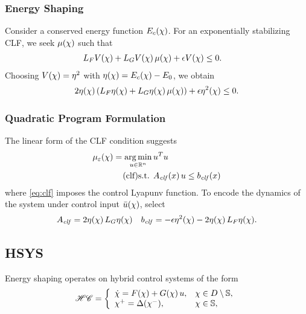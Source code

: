 \begin{frame}
  \frametitle{Energy Shaping}
  Consider a conserved energy function $E_{c}(\chi)$. For an exponentially stabilizing CLF, we seek $\mu(\chi)$ such that
  \begin{align*}
    L_{F} V(\chi) + L_{G} V(\chi) \, \mu(\chi) + \epsilon V(\chi) &\leq 0.
  \end{align*}
  Choosing $V(\chi) = \eta^{2}$ with $\eta(\chi) = E_{c}(\chi) - E_{0}$, we obtain
  \begin{align*}
    2 \eta(\chi) \left(L_{F} \eta(\chi) + L_{G} \eta(\chi) \, \mu(\chi) \right) + \epsilon \eta^{2}(\chi) \leq 0.
  \end{align*}
\end{frame}

\begin{frame}[t]
  \frametitle{Quadratic Program Formulation}
  The linear form of the CLF condition suggests
  \begin{align}
    \nonumber
    \mueps\arx = \argmin_{\uu \in \R^{n}}  \, & \uu^T \uu\\
    \label{eq:clf} \tag{clf}
    \mbox{s.t. } & \Aclf(x) \, \uu \leq \bclf(x)%
  \end{align}
  where \eqref{eq:clf} imposes the control Lyapunv function. To encode the dynamics of the system under control input ${\bar {u}}(\chi)$, select
  \begin{align*}
    A_{\mathit{clf}} = 2 \eta(\chi) \, L_{G} \eta(\chi)
    \quad
    b_{\mathit{clf}} = -\epsilon \eta^{2}(\chi) - 2\eta(\chi) \, L_{F} \eta(\chi).
  \end{align*}
\end{frame}

\subsection{HSYS}

\begin{frame}
  Energy shaping operates on hybrid control systems of the form
  \begin{align*}
    \mathscr{HC} = \left\{
      \begin{array}{l l}
        {\dot {\chi}} = F(\chi) + G(\chi) \, u, & \chi \in D \setminus \mathbb{S},\\
        \chi^{+} = \Delta(\chi^{-}), & \chi \in \mathbb{S},
      \end{array}\right.
  \end{align*}
\end{frame}

